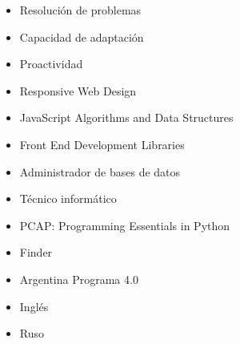 \documentclass[10pt,a4paper]{altacv}
\begin{document}
\begin{paracol}{2}
    

    \begin{itemize}
        \item Resolución de problemas
        \item Capacidad de adaptación
        \item Proactividad
    \end{itemize}

    \begin{itemize}
        \item Responsive Web Design
        \item JavaScript Algorithms and Data Structures
        \item Front End Development Libraries
        \item Administrador de bases de datos
        \item Técnico informático
        \item PCAP: Programming Essentials in Python
        \item Finder
        \item Argentina Programa 4.0
    \end{itemize}


    \begin{itemize}
        \item Inglés 
        \item Ruso  
    \end{itemize}
\end{paracol}
\end{document}
